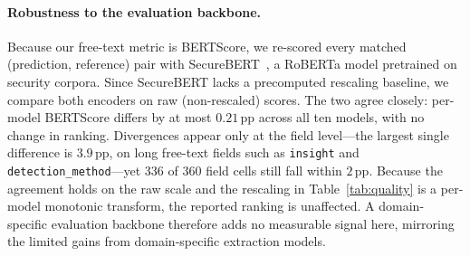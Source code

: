 \paragraph{Robustness to the evaluation backbone.}\label{sec:securebert}
Because our free-text metric is BERTScore, we re-scored every matched (prediction, reference) pair with SecureBERT~\cite{aghaei2022securebert}, a RoBERTa model pretrained on security corpora. Since SecureBERT lacks a precomputed rescaling baseline, we compare both encoders on raw (non-rescaled) scores. The two agree closely: per-model BERTScore differs by at most $0.21$\,pp across all ten models, with no change in ranking. Divergences appear only at the field level---the largest single difference is $3.9$\,pp, on long free-text fields such as \texttt{insight} and \texttt{detection\_method}---yet 336 of 360 field cells still fall within $2$\,pp. Because the agreement holds on the raw scale and the rescaling in Table~\ref{tab:quality} is a per-model monotonic transform, the reported ranking is unaffected. A domain-specific evaluation backbone therefore adds no measurable signal here, mirroring the limited gains from domain-specific extraction models.


